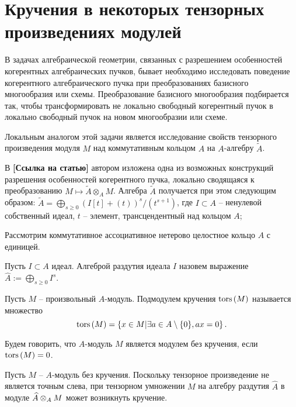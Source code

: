 \section{Кручения в некоторых тензорных произведениях модулей}
    В задачах алгебраической геометрии, связанных с разрешением особенностей когерентных 
    алгебраических пучков, бывает необходимо 
    исследовать поведение когерентного алгебраического пучка при преобразованиях базисного 
    многообразия или схемы.
    Преобразование базисного многообразия подбирается так, чтобы трансформировать не локально 
    свободный когерентный пучок в локально
    свободный пучок на новом многообразии или схеме. 

    Локальным аналогом этой задачи является исследование свойств тензорного произведения модуля $M$ 
    над коммутативным кольцом $A$ на $A$-алгебру $\widetilde{A}$.

    В \textbf{[Ссылка на статью]} автором изложена одна из возможных конструкций разрешения особенностей когерентного пучка, 
    локально сводящаяся к преобразованию $M \mapsto \widetilde{A} \otimes_A M$.
    Алгебра $\widetilde{A}$ получается при этом следующим образом: 
    $\widetilde{A} = \bigoplus_{s \geq 0} (I[t] + (t))^s / (t^{s + 1})$, где $I \subset A$ -- 
    ненулевой собственный
    идеал, $t$ -- элемент, трансцендентный над кольцом $A$;

    Рассмотрим коммутативное ассоциативное нетерово целостное кольцо $A$ с единицей. 
    
    \begin{Def}
        Пусть $I \subset A$ идеал. Алгеброй раздутия идеала $I$ назовем выражение 
        $\widehat{A} := \bigoplus_{s \geq 0} I^s$.
    \end{Def}

    \begin{Def}
        Пусть $M$ -- произвольный $A$-модуль. Подмодулем кручения $\textup{tors}\left(M\right)$ называется множество
        \begin{equation*}
            \textup{tors}\left(M\right) = \left\{x \in M | \exists a \in A\setminus \{0\}, ax = 0 \right\}.
        \end{equation*}
    \end{Def}
    \begin{Def}
        Будем говорить, что $A$-модуль $M$ является модулем без кручения, если $\textup{tors}\left(M\right) = 0$.
    \end{Def}

    Пусть $M$ -- $A$-модуль без кручения. Поскольку тензорное произведение не является точным слева, 
    при тензорном умножении $M$ на алгебру раздутия $\widehat{A}$ в модуле $\widehat{A} \otimes_A M$ 
    может возникнуть кручение. 

